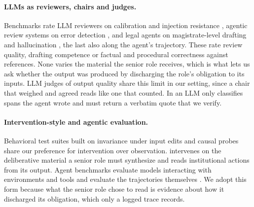 \paragraph{LLMs as reviewers, chairs and judges.}
Benchmarks rate LLM reviewers on calibration
and injection resistance \citep{li2026llmreviewer}, agentic review systems
on error detection \citep{nguyen2026agenticreview}, and legal agents on
magistrate-level drafting \citep{pires2026magisbench} and hallucination
\citep{zhou2026lexagenthallu}, the last also along the agent's trajectory.
These rate review quality, drafting competence or factual and procedural
correctness against references. None varies the material the senior role
receives, which is what lets us ask whether the output was produced by
discharging the role's obligation to its inputs. LLM judges of output
quality \citep{zheng2023judge, dubois2024alpaca} share this limit in our
setting, since a chair that weighed and agreed reads like one that counted.
In \ribench{} an LLM only classifies spans the agent wrote and must return
a verbatim quote that we verify.

\paragraph{Intervention-style and agentic evaluation.}
Behavioral test suites built on invariance under input edits
\citep{ribeiro2020checklist} and causal probes \citep{arora2024causalgym}
share our preference for intervention over observation. \ribench{}
intervenes on the deliberative material a senior role must synthesize and
reads institutional actions from its output. Agent benchmarks evaluate
models interacting with environments and tools
\citep{liu2023agentbench, jimenez2024swebench, yao2024taubench} and
evaluate the trajectories themselves \citep{lu2025agentrewardbench}. We
adopt this form because what the senior role chose to read is evidence
about how it discharged its obligation, which only a logged trace records.

